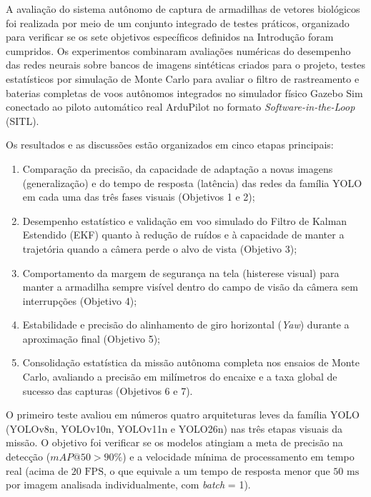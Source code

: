 
A avaliação do sistema autônomo de captura de armadilhas de vetores biológicos foi realizada por meio de um conjunto integrado de testes práticos, organizado para verificar se os sete objetivos específicos definidos na Introdução foram cumpridos. Os experimentos combinaram avaliações numéricas do desempenho das redes neurais sobre bancos de imagens sintéticas criados para o projeto, testes estatísticos por simulação de Monte Carlo para avaliar o filtro de rastreamento e baterias completas de voos autônomos integrados no simulador físico Gazebo Sim conectado ao piloto automático real ArduPilot no formato \textit{Software-in-the-Loop} (SITL).

Os resultados e as discussões estão organizados em cinco etapas principais:
\begin{enumerate}
	\item Comparação da precisão, da capacidade de adaptação a novas imagens (generalização) e do tempo de resposta (latência) das redes da família YOLO em cada uma das três fases visuais (Objetivos 1 e 2);
	\item Desempenho estatístico e validação em voo simulado do Filtro de Kalman Estendido (EKF) quanto à redução de ruídos e à capacidade de manter a trajetória quando a câmera perde o alvo de vista (Objetivo 3);
	\item Comportamento da margem de segurança na tela (histerese visual) para manter a armadilha sempre visível dentro do campo de visão da câmera sem interrupções (Objetivo 4);
	\item Estabilidade e precisão do alinhamento de giro horizontal (\textit{Yaw}) durante a aproximação final (Objetivo 5);
	\item Consolidação estatística da missão autônoma completa nos ensaios de Monte Carlo, avaliando a precisão em milímetros do encaixe e a taxa global de sucesso das capturas (Objetivos 6 e 7).
\end{enumerate}


O primeiro teste avaliou em números quatro arquiteturas leves da família YOLO (YOLOv8n, YOLOv10n, YOLOv11n e YOLO26n) nas três etapas visuais da missão. O objetivo foi verificar se os modelos atingiam a meta de precisão na detecção ($mAP@50 > 90\%$) e a velocidade mínima de processamento em tempo real (acima de $20\text{ FPS}$, o que equivale a um tempo de resposta menor que $50\text{ ms}$ por imagem analisada individualmente, com \textit{batch} = 1).

